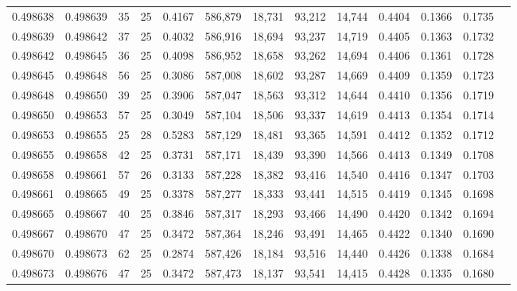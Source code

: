 \begin{tabular}{rrrrrrrrrrrrr}
0.498638 & 0.498639 &    35 &  25 &                                     0.4167 & 586,879 &  18,731 &  93,212 &  14,744 & 0.4404 & 0.1366 & 0.1735 \\
0.498639 & 0.498642 &    37 &  25 &                                     0.4032 & 586,916 &  18,694 &  93,237 &  14,719 & 0.4405 & 0.1363 & 0.1732 \\
0.498642 & 0.498645 &    36 &  25 &                                     0.4098 & 586,952 &  18,658 &  93,262 &  14,694 & 0.4406 & 0.1361 & 0.1728 \\
0.498645 & 0.498648 &    56 &  25 &                                     0.3086 & 587,008 &  18,602 &  93,287 &  14,669 & 0.4409 & 0.1359 & 0.1723 \\
0.498648 & 0.498650 &    39 &  25 &                                     0.3906 & 587,047 &  18,563 &  93,312 &  14,644 & 0.4410 & 0.1356 & 0.1719 \\
0.498650 & 0.498653 &    57 &  25 &                                     0.3049 & 587,104 &  18,506 &  93,337 &  14,619 & 0.4413 & 0.1354 & 0.1714 \\
0.498653 & 0.498655 &    25 &  28 &                                     0.5283 & 587,129 &  18,481 &  93,365 &  14,591 & 0.4412 & 0.1352 & 0.1712 \\
0.498655 & 0.498658 &    42 &  25 &                                     0.3731 & 587,171 &  18,439 &  93,390 &  14,566 & 0.4413 & 0.1349 & 0.1708 \\
0.498658 & 0.498661 &    57 &  26 &                                     0.3133 & 587,228 &  18,382 &  93,416 &  14,540 & 0.4416 & 0.1347 & 0.1703 \\
0.498661 & 0.498665 &    49 &  25 &                                     0.3378 & 587,277 &  18,333 &  93,441 &  14,515 & 0.4419 & 0.1345 & 0.1698 \\
0.498665 & 0.498667 &    40 &  25 &                                     0.3846 & 587,317 &  18,293 &  93,466 &  14,490 & 0.4420 & 0.1342 & 0.1694 \\
0.498667 & 0.498670 &    47 &  25 &                                     0.3472 & 587,364 &  18,246 &  93,491 &  14,465 & 0.4422 & 0.1340 & 0.1690 \\
0.498670 & 0.498673 &    62 &  25 &                                     0.2874 & 587,426 &  18,184 &  93,516 &  14,440 & 0.4426 & 0.1338 & 0.1684 \\
0.498673 & 0.498676 &    47 &  25 &                                     0.3472 & 587,473 &  18,137 &  93,541 &  14,415 & 0.4428 & 0.1335 & 0.1680 \\

\end{tabular}
